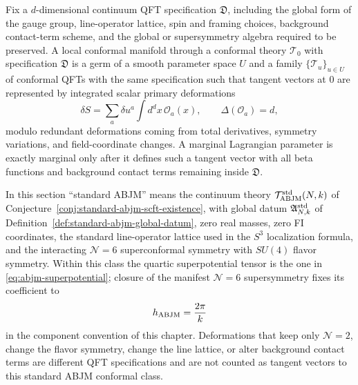\begin{definition}
\label{def:fixed-qft-specification-conformal-manifold}
Fix a \(d\)-dimensional continuum QFT specification \(\mathfrak D\), including the
global form of the gauge group, line-operator lattice, spin and framing
choices, background contact-term scheme, and the global or supersymmetry
algebra required to be preserved.  A local conformal manifold through a
conformal theory \(\mathcal T_0\) with specification \(\mathfrak D\) is a germ of a
smooth parameter space \(U\) and a family \(\{\mathcal T_u\}_{u\in U}\) of
conformal QFTs with the same specification such that tangent vectors at \(0\) are
represented by integrated scalar primary deformations
\[
  \delta S
  =
  \sum_a \delta u^a\int d^d x\,\mathcal O_a(x),
  \qquad
  \Delta(\mathcal O_a)=d,
\]
modulo redundant deformations coming from total derivatives, symmetry
variations, and field-coordinate changes.  A marginal Lagrangian parameter
is exactly marginal only after it defines such a tangent vector with all beta
functions and background contact terms remaining inside \(\mathfrak D\).
\end{definition}

\begin{hypothesis}
\label{hyp:standard-abjm-conformal-class}
In this section ``standard ABJM'' means the continuum theory
\(\mathcal T_{\rm ABJM}^{\rm std}(N,k)\) of
Conjecture~\ref{conj:standard-abjm-scft-existence}, with global datum
\(\mathfrak A^{\rm std}_{N,k}\) of
Definition~\ref{def:standard-abjm-global-datum}, zero real masses, zero FI
coordinates, the standard line-operator lattice used in the \(S^3\)
localization formula, and the interacting \(\mathcal N=6\) superconformal
symmetry with \(SU(4)\) flavor symmetry.  Within this class the quartic
superpotential tensor is the one in \eqref{eq:abjm-superpotential}; closure of
the manifest \(\mathcal N=6\) supersymmetry fixes its coefficient to
\[
  h_{\rm ABJM}=\frac{2\pi}{k}
\]
in the component convention of this chapter.  Deformations that keep only
\(\mathcal N=2\), change the flavor symmetry, change the line lattice, or
alter background contact terms are different QFT specifications and are not counted as
tangent vectors to this standard ABJM conformal class.
\end{hypothesis}

